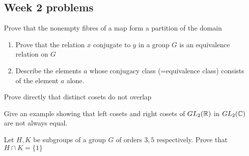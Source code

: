 
\subsection{Week 2 problems}

\begin{boxedProblem}[2.5.1]
    Prove that the nonempty fibres of a map form a partition of the domain
\end{boxedProblem}

\begin{boxedProblem}[2.5.6]
    \begin{enumerate}
        \item Prove that the relation $x$ conjugate to $y$ in a group $G$ is an equivalence relation on $G$
        \item Describe the elements $a$ whose conjugacy class (=equivalence class) consists of the element $a$ alone. 
    \end{enumerate}
\end{boxedProblem}

\begin{boxedProblem}[2.6.2]
    Prove directly that distinct cosets do not overlap
\end{boxedProblem}

\begin{boxedProblem}[2.6.4]
    Give an example showing that left cosets and right cosets of $GL_2(\mathbb{R})$ in $GL_2(\mathbb{C})$ are not always equal.
\end{boxedProblem}

\begin{boxedProblem}[2.6.5]
    Let $H, K$ be subgroups of a group $G$ of orders $3, 5$ respectively. Prove that $H \cap K = \{1\}$
\end{boxedProblem}